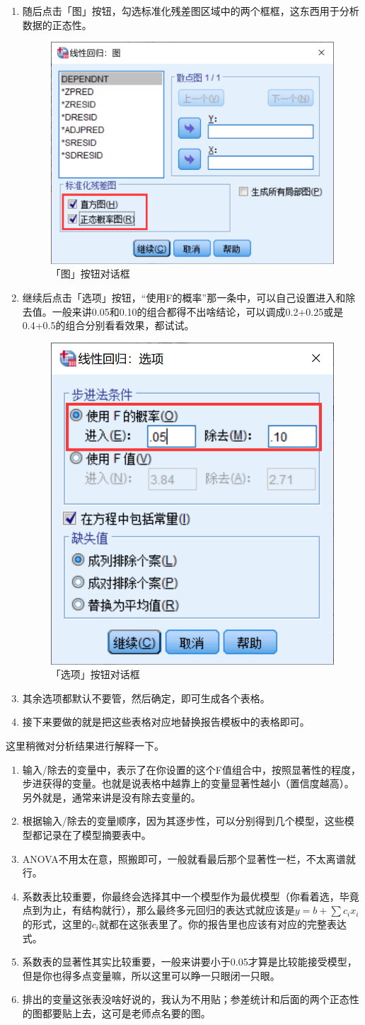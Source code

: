 \documentclass[10pt, a4paper]{article}
\begin{document}
\begin{enumerate}
    \item 随后点击「图」按钮，勾选标准化残差图区域中的两个框框，这东西用于分析数据的正态性。
    \begin{figure}[H]
        \centering
        \includegraphics[width=0.3\linewidth]{graph.png}
        \caption{「图」按钮对话框}
        \label{fig:graph}
    \end{figure}
    \item 继续后点击「选项」按钮，“使用F的概率”那一条中，可以自己设置进入和除去值。一般来讲0.05和0.10的组合都得不出啥结论，可以调成0.2+0.25或是0.4+0.5的组合分别看看效果，都试试。
    \begin{figure}[H]
        \centering
        \includegraphics[width=0.3\linewidth]{stepwise.png}
        \caption{「选项」按钮对话框}
        \label{fig:stepwise}
    \end{figure}
    \item 其余选项都默认不要管，然后确定，即可生成各个表格。
    \item 接下来要做的就是把这些表格对应地替换报告模板中的表格即可。
\end{enumerate} \par
这里稍微对分析结果进行解释一下。
\begin{enumerate}
    \item 输入/除去的变量中，表示了在你设置的这个F值组合中，按照显著性的程度，步进获得的变量。也就是说表格中越靠上的变量显著性越小（置信度越高）。另外就是，通常来讲是没有除去变量的。
    \item 根据输入/除去的变量顺序，因为其逐步性，可以分别得到几个模型，这些模型都记录在了模型摘要表中。
    \item ANOVA不用太在意，照搬即可，一般就看最后那个显著性一栏，不太离谱就行。
    \item 系数表比较重要，你最终会选择其中一个模型作为最优模型（你看着选，毕竟点到为止，有结构就行），那么最终多元回归的表达式就应该是$y=b+\sum c_i x_i$的形式，这里的$c_i$就都在这张表里了。你的报告里也应该有对应的完整表达式。
    \item 系数表的显著性其实比较重要，一般来讲要小于0.05才算是比较能接受模型，但是你也得多点变量嘛，所以这里可以睁一只眼闭一只眼。
    \item 排出的变量这张表没啥好说的，我认为不用贴；参差统计和后面的两个正态性的图都要贴上去，这可是老师点名要的图。
\end{enumerate}
\end{document}
